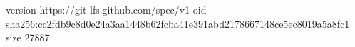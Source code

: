 version https://git-lfs.github.com/spec/v1
oid sha256:cc2fdb9c8d0e24a3aa1448b62fcba41e391abd2178667148ce5ec8019a5a8fc1
size 27887
